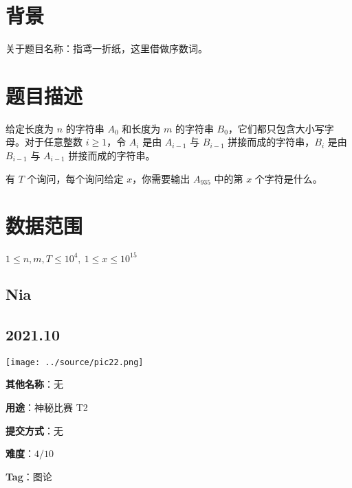 \documentclass[a4paper,10pt]{article}
\begin{document}
\newpage

\section*{背景}

关于题目名称：指鸢一折纸，这里借做序数词。

\section*{题目描述}

给定长度为 $n$ 的字符串 $A_0$ 和长度为 $m$ 的字符串 $B_0$，它们都只包含大小写字母。对于任意整数 $i\ge 1$，令 $A_i$ 是由 $A_{i-1}$ 与 $B_{i-1}$ 拼接而成的字符串，$B_i$ 是由 $B_{i-1}$ 与 $A_{i-1}$ 拼接而成的字符串。

有 $T$ 个询问，每个询问给定 $x$，你需要输出 $A_{935}$ 中的第 $x$ 个字符是什么。

\section*{数据范围}

$1\leq n,m,T\leq 10^4,\ 1\leq x\leq 10^{15}$

\newpage

\vspace*{\fill}
\begin{center}

\section{Nia}

\subsection*{2021.10}

\vspace{10pt}

\texttt{[image: ../source/pic22.png]}

\vspace{10pt}

\textbf{其他名称}：无

\vspace{10pt}

\textbf{用途}：神秘比赛 T2

\vspace{10pt}

\textbf{提交方式}：无

\vspace{10pt}

\textbf{难度}：$4/10$

\vspace{10pt}

\textbf{Tag}：图论

\end{center}
\vspace*{\fill}
\end{document}
